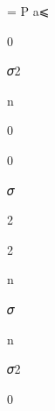 \documentclass[a4paper,portrait,12pt]{article}
\begin{document}
\begin{flushleft}
= P a⩽
\end{flushleft}





0





\begin{flushleft}
𝜎2
\end{flushleft}





\begin{flushleft}
n
\end{flushleft}





0





0





\begin{flushleft}
𝜎
\end{flushleft}





2





2





\begin{flushleft}
n
\end{flushleft}





\begin{flushleft}
𝜎
\end{flushleft}





\begin{flushleft}
n
\end{flushleft}





\begin{flushleft}
𝜎2
\end{flushleft}





0
\end{document}
